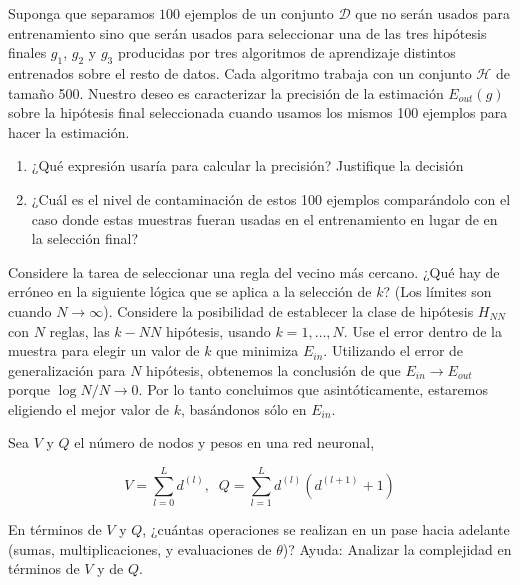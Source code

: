 \documentclass[11pt,leqno]{article}
\theoremstyle{definition}
\begin{document}
\begin{cuestion}
Suponga que separamos $100$ ejemplos de un conjunto $\mathcal{D}$ que no serán usados para entrenamiento sino que serán usados para seleccionar una de las tres hipótesis finales $g_1$, $g_2$ y $g_3$ producidas por tres algoritmos de aprendizaje distintos entrenados sobre el resto de datos.
Cada algoritmo trabaja con un conjunto $\mathcal{H}$ de tamaño 500. Nuestro deseo es caracterizar la precisión de la estimación $E_{out}(g)$ sobre la hipótesis final seleccionada cuando usamos los mismos 100 ejemplos para hacer la estimación.
\begin{enumerate}[a]
\item ¿Qué expresión usaría para calcular la precisión? Justifique la decisión
\item ¿Cuál es el nivel de contaminación de estos 100 ejemplos comparándolo con el caso donde estas muestras fueran usadas en el entrenamiento en lugar de en la selección final?
\end{enumerate}
\end{cuestion}



\begin{cuestion}
Considere la tarea de seleccionar una regla del vecino más cercano. ¿Qué hay de erróneo en la siguiente lógica que se aplica a la selección de $k$? (Los límites son cuando $N \rightarrow \infty$).
Considere la posibilidad de establecer la clase de hipótesis $H_{NN}$ con $N$ reglas, las $k-NN$ hipótesis, usando $k =1,\dots,N$. Use el error dentro de la muestra para elegir un valor de $k$ que minimiza $E_{in}$. Utilizando el error de generalización para $N$ hipótesis, obtenemos la conclusión
de que $E_{in} \rightarrow E_{out}$ porque $\log N/N \rightarrow 0$. Por lo tanto concluimos que asintóticamente,
estaremos eligiendo el mejor valor de $k$, basándonos sólo en $E_{in}$.
\end{cuestion}


  \begin{cuestion}
    Sea $V$ y $Q$ el número de nodos y pesos en una red neuronal,

    $$ V = \sum_{l=0}^L d^{(l)}, \; \; Q = \sum_{l=1}^L d^{(l)} \left( d^{(l+1)} + 1\right) $$

    En términos de $V$ y $Q$, ¿cuántas operaciones se realizan en un pase hacia adelante (sumas, multiplicaciones, y evaluaciones de $\theta$)? Ayuda: Analizar la complejidad en términos de $V$ y de $Q$.
  \end{cuestion}
\end{document}
